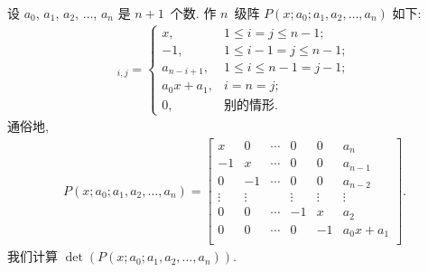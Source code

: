 \documentclass[../libro.tex]{subfiles}
\begin{document}
\begin{example}
    设 \(a_0\), \(a_1\), \(a_2\), \(\dots\), \(a_n\) 是 \(n+1\)~个数.
    作 \(n\)~级阵 \(P(x; a_0; a_1, a_2, \dots, a_n)\) 如下:
    \begin{align*}
        [P(x; a_0; a_1, a_2, \dots, a_n)]_{i,j} =
        \begin{cases}
            x,           & 1 \leq i = j \leq n-1;   \\
            -1,          & 1 \leq i-1 = j \leq n-1; \\
            a_{n-i+1},   & 1 \leq i \leq n-1 = j-1; \\
            a_0 x + a_1, & i = n = j;               \\
            0,           & \text{别的情形}.
        \end{cases}
    \end{align*}
    通俗地,
    \begin{align*}
        P(x; a_0; a_1, a_2, \dots, a_n)
        =
        \begin{bmatrix}
            x      & 0      & \cdots & 0      & 0      & a_n         \\
            -1     & x      & \cdots & 0      & 0      & a_{n-1}     \\
            0      & -1     & \cdots & 0      & 0      & a_{n-2}     \\
            \vdots & \vdots & {}     & \vdots & \vdots & \vdots      \\
            0      & 0      & \cdots & -1     & x      & a_2         \\
            0      & 0      & \cdots & 0      & -1     & a_0 x + a_1 \\
        \end{bmatrix}.
    \end{align*}
    我们计算 \(\det {(P(x; a_0; a_1, a_2, \dots, a_n))}\).


\end{example}
\end{document}
